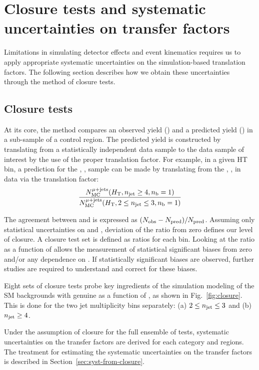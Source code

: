 \clearpage
\section{Closure tests and systematic uncertainties on transfer factors\label{sec:bkgd-syst}}

Limitations in simulating detector effects and event kinematics 
requires us to apply appropriate systematic uncertainties 
on the simulation-based translation factors. The following section 
describes how we obtain these uncertainties through the method of closure tests.

\subsection{Closure tests\label{sec:closure-tests-desc}}

At its core, the method compares an observed yield (\nobs) and a predicted
yield (\npre) in a sub-sample of a control region.  The predicted yield is constructed
by translating from a statistically independent data sample to the data sample of
interest by the use of the proper translation factor.  For example, in a given HT bin,
a prediction for the \njethigh, , \mj sample can be made by translating from the
\njetlow, , \mj in data via the translation factor: 
\begin{equation}
  \label{equ:tf-ratio-closure}
  \frac{N_{\rm MC}^{\rm \mu + jets}(\mbox{$H_\text{T}$},n_{\text{jet}} \geq 4, n_{\text{b}}=1)}{N_{\rm MC}^{\rm \mu + jets}(\mbox{$H_\text{T}$},2 \leq n_{\text{jet}} \leq 3,n_{\text{b}}=1)} 
\end{equation}

The agreement between \nobs and \npre is expressed as $(N_{\textrm{obs}} - N_{\textrm{pred}})/N_{\textrm{pred}}$.
Assuming only statistical uncertainties on \nobs and \npre, deviation of the 
ratio from zero defines our level of closure. A closure test set is defined
as ratios for each \scalht bin. Looking at the ratio as a function
of \scalht allows the measurement of statistical significant biases from zero and/or 
any dependence on \scalht.  If statistically significant biases
are observed, further studies are required to understand and correct
for these biases.

Eight sets of closure tests probe key ingredients of the simulation modeling 
of the SM backgrounds with genuine \met as a function of \scalht, as shown in
Fig.~\ref{fig:closure}. This is done for the two jet multiplicity bins
separately: (a) $2 \leq n_{\text{jet}} \leq 3$ and (b) $n_{\text{jet}} \geq 4$.

Under the assumption of closure for the full ensemble of tests,
systematic uncertainties on the transfer factors are derived for each
\njet category and \scalht regions. The treatment for
estimating the systematic uncertainties on the transfer factors is
described in Section~\ref{sec:syst-from-closure}.

